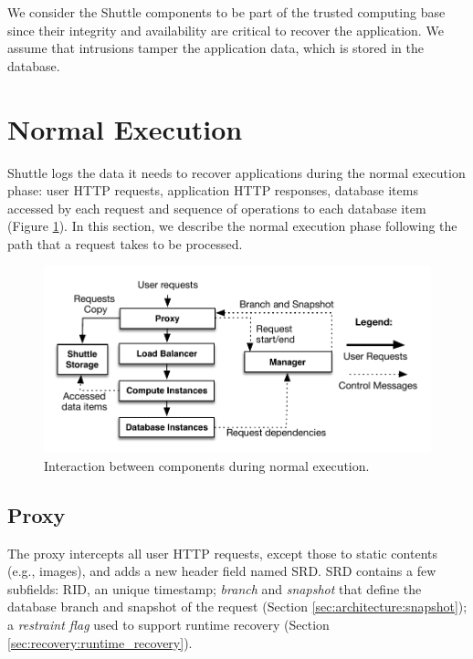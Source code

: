 We consider the Shuttle components to be part of the trusted computing base since their integrity and availability are critical to recover the application. We assume that intrusions tamper the application data, which is stored in the database.





\section{Normal Execution}
\label{sec:architecture:normal_execution}

Shuttle logs the data it needs to recover applications during the normal execution phase: user HTTP requests, application HTTP responses, database items accessed by each request and sequence of operations to each database item (Figure \ref{fig:normal_execution}). In this section, we describe the normal execution phase following the path that a request takes to be processed.

\begin{figure}
  \centering
  \includegraphics[width=0.7\linewidth]{images/normalExecution}
  \caption{Interaction between components during normal execution.}
  \label{fig:normal_execution}
\end{figure}


\subsection{Proxy}
\label{sec:architecture:proxy}

The proxy intercepts all user HTTP requests, except those to static contents (e.g., images), and adds a new header field named \acf{SRD}. \ac{SRD} contains a few subfields: \acf{RID}, an unique timestamp; \emph{branch} and \emph{snapshot} that define the database branch and snapshot of the request (Section \ref{sec:architecture:snapshot}); a \emph{restraint flag} used to support runtime recovery (Section \ref{sec:recovery:runtime_recovery}). 

